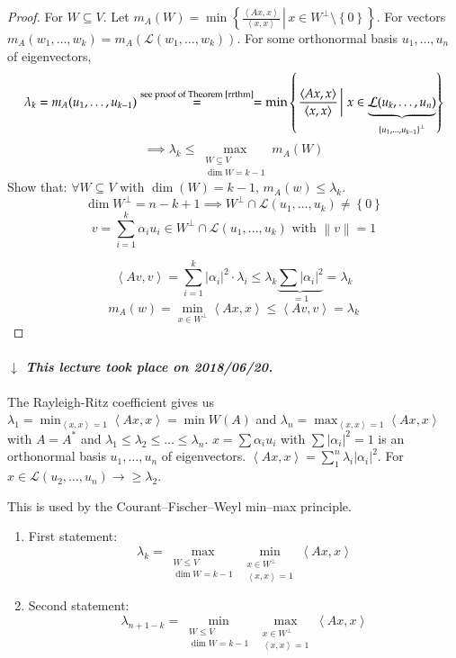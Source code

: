 \documentclass{article}
\newcommand{\set}[1]{\left\{#1\right\}}
\newcommand{\setdef}[2]{\left\{\left.#1\,\right|\,#2\right\}}
\newcommand{\angel}[1]{\left\langle#1\right\rangle}
\newcommand{\norm}[1]{\left\|#1\right\|}
\newcommand{\card}[1]{\left|#1\right|}
\newcommand{\dateref}[1]{%
  \begin{mdframed}[backgroundcolor=gray!10,innerbottommargin=0pt,innertopmargin=0pt]
    \paragraph{\textit{$\downarrow$ This lecture took place on #1.}}%
  \end{mdframed}%
}
\begin{document}
\begin{proof}
  For $W \subseteq V$.
  Let $m_A(W) = \min\setdef{\frac{\angel{Ax, x}}{\angel{x, x}}}{x \in W^\bot \setminus \set{0}}$.
  For vectors $m_A(w_1, \dots, w_k) = m_A(\mathcal L(w_1, \dots, w_k))$.
  For some orthonormal basis $u_1, \dots, u_n$ of eigenvectors,
  \[ \lambda_k = m_A(u_1, \dots, u_{k-1}) \overset{\text{see proof of Theorem~\ref{rrthm}}}{=} = \min \setdef{\frac{\angel{Ax, x}}{\angel{x, x}}}{x \in \underbrace{\mathcal L(u_k, \dots, u_n)}_{\set{u_1, \dots, u_{k-1}}^\bot}} \]
  \[ \implies \lambda_k \leq \max_{\substack{W \subseteq V \\ \dim{W} = k - 1}} m_A(W) \]
  Show that: $\forall W \subseteq V$ with $\dim(W) = k-1$, $m_A(w) \leq \lambda_k$.
  \[ \dim{W^{\bot}} = n - k + 1 \implies W^\bot \cap \mathcal L(u_1, \dots, u_k) \neq \set{0} \]
  \[ v = \sum_{i=1}^k \alpha_i u_i \in W^\bot \cap \mathcal L(u_1, \dots, u_k) \text{ with } \norm{v} = 1 \]

  \[ \angel{Av, v} = \sum_{i=1}^k \card{\alpha_i}^2 \cdot \lambda_i \leq \lambda_k \underbrace{\sum \card{\alpha_i}^2}_{=1} = \lambda_k \]
  \[ m_A(w) = \min_{x \in W^\bot} \angel{Ax, x} \leq \angel{Av, v} = \lambda_k \]
\end{proof}

\dateref{2018/06/20}

The Rayleigh-Ritz coefficient gives us $\lambda_1 = \min_{\angel{x,x} = 1} \angel{Ax, x} = \min{W(A)}$ and $\lambda_n = \max_{\angel{x,x} = 1} \angel{Ax, x}$ with $A = A^*$ and $\lambda_1 \leq \lambda_2 \leq \dots \leq \lambda_n$. $x = \sum \alpha_i u_i$ with $\sum \card{\alpha_i}^2 = 1$ is an orthonormal basis $u_1, \dots, u_n$ of eigenvectors. $\angel{Ax, x} = \sum_1^n \lambda_i \card{\alpha_i}^2$. For $x \in \mathcal L(u_2, \dots, u_n) \to \geq \lambda_2$.

This is used by the Courant--Fischer--Weyl min--max principle.

\begin{enumerate}
  \item First statement:
    \[ \lambda_k = \max_{\substack{W \leq V \\ \dim{W} = k-1}} \min_{\substack{x \in W^\bot \\ \angel{x, x} = 1}} \angel{Ax, x} \]
  \item Second statement:
    \[ \lambda_{n+1-k} = \min_{\substack{W \leq V \\ \dim{W} = k-1}} \max_{\substack{x \in W^\bot \\ \angel{x,x} = 1}} \angel{Ax, x} \]
\end{enumerate}
\end{document}
